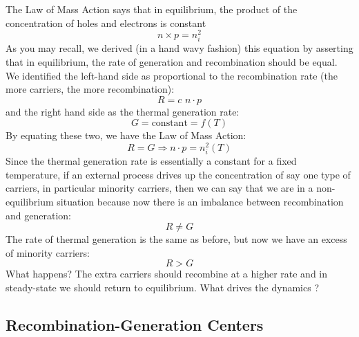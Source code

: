 The Law of Mass Action says that in equilibrium, the product of the concentration of holes and electrons is constant
\begin{equation}
	n \times p = n_i^2
\end{equation}
As you may recall, we derived (in a hand wavy fashion) this equation by asserting that in equilibrium, the rate of generation and recombination should be equal.  We identified the left-hand side as proportional to the recombination rate (the more carriers, the more recombination):
\begin{equation}
	R = c\,\, n \cdot p 
\end{equation}
%
and the right hand side as the thermal generation rate:
\begin{equation}
	G = \text{constant} = f(T) 
\end{equation}
By equating these two, we have the Law of Mass Action:
\begin{equation}
	R = G \Rightarrow n \cdot p = n_i^2(T) 
\end{equation}
%
Since the thermal generation rate is essentially a constant for a fixed temperature, if an external process drives up the concentration of say one type of carriers, in particular minority carriers, then we can say that we are in a non-equilibrium situation because now there is an imbalance between recombination and generation:  
 \begin{equation}
	R \ne G 
\end{equation}
The rate of thermal generation is the same as before, but now we have an excess of minority carriers: 
 \begin{equation}
	 R > G 
\end{equation}
What happens? The extra carriers should recombine at a higher rate and in steady-state we should return to equilibrium.  What drives the dynamics ?


\subsection{Recombination-Generation Centers}

